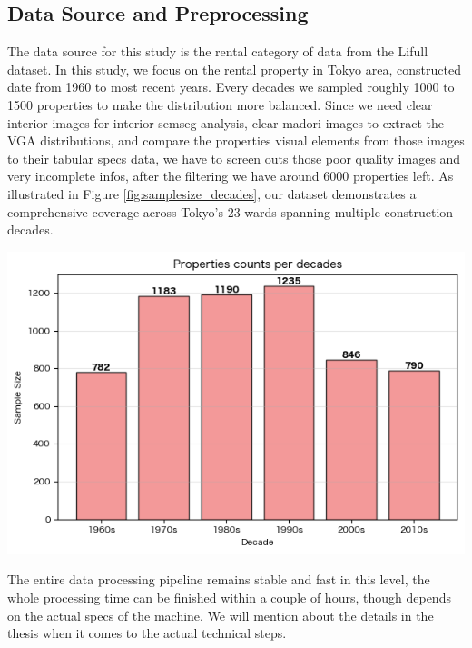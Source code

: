 \documentclass[11pt,a4paper]{article}
\begin{document}
\begin{multicols}{2}
\section{Data Source and Preprocessing}

The data source for this study is the rental category of data from the Lifull dataset. In this study, 
we focus on the rental property in Tokyo area, constructed date from 1960 to most recent years. Every 
decades we sampled roughly 1000 to 1500 properties to make the distribution more balanced. Since we 
need clear interior images for interior semseg analysis, clear madori images to extract the VGA distributions,
and compare the properties visual elements from those images to their tabular specs data, we have to screen 
outs those poor quality images and very incomplete infos, after the filtering we have around 6000 
properties left. As illustrated in Figure \ref{fig:samplesize_decades}, our dataset demonstrates a comprehensive coverage 
across Tokyo's 23 wards spanning multiple construction decades. 
\begin{center}
    \includegraphics[width=\columnwidth]{plots/samplesize_decades.png}
    \label{fig:samplesize_decades}
\end{center}

The entire data processing pipeline remains stable and fast in this level, the whole 
processing time can be finished within a couple of hours, though depends on the actual specs of the 
machine. We will mention about the details in the thesis when it comes to the actual technical steps.




\end{multicols}
\end{document}
